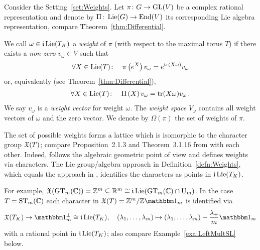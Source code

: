 \begin{defn} \label{defn:Weights}
	Consider the Setting~\ref{set:Weights}.
	Let $\pi \colon G \to \operatorname{GL}(V)$ be a complex rational representation and denote by $\Pi \colon \operatorname{Lie}(G) \to \operatorname{End}(V)$ its corresponding Lie algebra representation, compare Theorem~\ref{thm:Differential}.
	
	We call $\omega \in \mathfrak{i} \operatorname{Lie}(T_K)$ a \emph{weight} of $\pi$ (with respect to the maximal torus $T$) if there exists a \emph{non-zero} $v_\omega \in V$ such that
	\begin{align*}
		\forall X \in \operatorname{Lie}(T)  \colon \quad
		\pi \left( e^X \right) v_\omega = e^{ \operatorname{tr}(X \omega)} v_\omega
	\end{align*}
	or, equivalently (see Theorem~\ref{thm:Differential}),
	\begin{align*}
		\forall X \in \operatorname{Lie}(T)  \colon \quad
		\Pi \left( X \right) v_\omega =  \operatorname{tr}(X \omega) v_\omega \, .
	\end{align*}
	We say $v_\omega$ is a \emph{weight vector} for weight $\omega$. The \emph{weight space} $V_\omega$ contains all weight vectors of $\omega$ and the zero vector. We denote by $\Omega(\pi)$ the set of weights of $\pi$.
	\hfill{}
\end{defn}

\begin{remark}\label{rem:WeightsAsCharacters}
	The set of possible weights forms a lattice which is isomorphic to the character group $\mathfrak{X}(T)$; compare Proposition~2.1.3 and Theorem~3.1.16 from \cite{GoodmanWallachBook} with each other.
	Indeed, \cite[Proposition~2.1.3]{GoodmanWallachBook} follows the algebraic geometric point of view and defines weights via characters. The Lie group/algebra approach in Definition~\ref{defn:Weights}, which equals the approach in \cite[Theorem~3.1.16]{GoodmanWallachBook}, identifies the characters as points in $\mathfrak{i} \operatorname{Lie}(T_K)$.
	
	For example, $\mathfrak{X}(\operatorname{GT}_m(\mathbb C)) = \mathbb Z^m \subseteq \mathbb R^m \cong \mathfrak{i} \operatorname{Lie}(\operatorname{GT}_m(\mathbb C) \cap \operatorname{U}_m)$. In the case $T = \operatorname{ST}_m(\mathbb C)$ each character in $\Xfrak(T) = \ZZ^m / \ZZ \ones_m$ is identified via
		\[ \Xfrak(T_K) \to \onePerp \cong \imag \Lie(T_K), \quad (\lambda_1, \ldots, \lambda_m) \mapsto (\lambda_1, \ldots, \lambda_m) - \frac{\lambda_+}{m} \ones_m\]
	with a rational point in $\mathfrak{i} \operatorname{Lie}(T_K)$; also compare Example~\ref{exa:LeftMultSL} below.
	\hfill\remSymbol
\end{remark}

